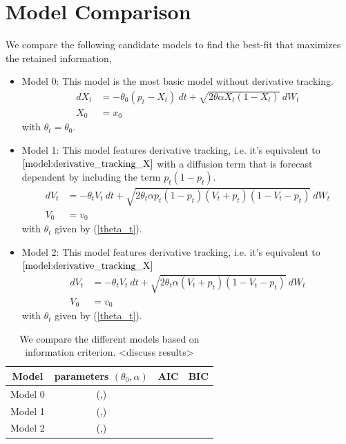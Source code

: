 \documentclass[10pt,twocolumn,letterpaper]{article}
\begin{document}
\section{Model Comparison}
We compare the following candidate models to find the best-fit that maximizes the retained information,
\begin{itemize}
  \item Model 0: This model is the most basic model without derivative tracking.
  \begin{equation}
  \begin{split}
  dX_t &=  - \theta_0 (p_t-X_t) \  dt + \sqrt{2 \theta \alpha X_t (1-X_t)} \  dW_t  \\ %
  X_0 & = x_0
\end{split}\label{M0}
  \end{equation}
  with $\theta_t= \theta_0 $.

  \item Model 1: This model features derivative tracking, i.e. it's equivalent to $\ref{model:derivative_tracking_X}$ with a diffusion term that is forecast dependent by including the term $p_t(1-p_t)$.
  \begin{equation}
  \begin{split}
  dV_t &=  - \theta_t V_t \  dt + \sqrt{2 \theta_t \alpha p_t(1-p_t)(V_t +p_t ) (1-V_t-p_t)} \  dW_t  \\ %
  V_0 & = v_0
  \end{split}\label{M2}
  \end{equation}
  with $\theta_t$ given by (\ref{theta_t}).

  \item Model 2: This model features derivative tracking, i.e. it's equivalent to $\ref{model:derivative_tracking_X}$
\begin{equation}
  \begin{split}
  dV_t &=  - \theta_t V_t \  dt + \sqrt{2 \theta_t \alpha (V_t +p_t ) (1-V_t-p_t)} \  dW_t  \\ %
  V_0 & = v_0
  \end{split}\label{M2}
  \end{equation}
  with $\theta_t$ given by (\ref{theta_t}).
\end{itemize}


\begin{table}[]
\centering
\begin{tabular}{|c|c|c|c|}
\hline
Model   &  parameters $(\theta_0, \alpha)$   & AIC & BIC \\ \hline
Model 0 &  (,)   &     &     \\ \hline
Model 1 &   (,)  &     &      \\ \hline
Model 2 &   (,)  &     &       \\ \hline
\end{tabular}
\caption{We compare the different models based on information criterion. <discuss results> }
\label{tab:model_comparison}
\end{table}
\end{document}
